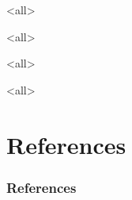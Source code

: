 \begin{paracol}{2}

\begin{rightcolumn}

\mode<all>

\mode*

\clearpage

\mode<all>

\mode*

\clearpage

\mode<all>

\mode*

\clearpage

\mode<all>

\mode*

\section{References}
\begin{frame}[allowframebreaks] \frametitle{References}
	\scriptsize
	
	
\end{frame}

\end{rightcolumn}
\end{paracol}


